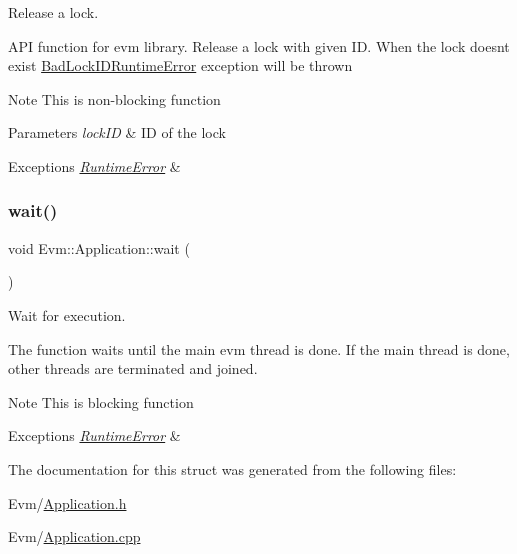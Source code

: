 Release a lock. 

A\+PI function for evm library. Release a lock with given ID. When the lock doesn\textquotesingle{}t exist \mbox{\hyperlink{struct_evm_1_1_bad_lock_i_d_runtime_error}{Bad\+Lock\+I\+D\+Runtime\+Error}} exception will be thrown \begin{DoxyNote}{Note}
This is non-\/blocking function 
\end{DoxyNote}

\begin{DoxyParams}{Parameters}
{\em lock\+ID} & ID of the lock \\
\hline
\end{DoxyParams}

\begin{DoxyExceptions}{Exceptions}
{\em \mbox{\hyperlink{struct_evm_1_1_runtime_error}{Runtime\+Error}}} & \\
\hline
\end{DoxyExceptions}
\mbox{\label{struct_evm_1_1_application_a17e8baa475b18f35f70823a91f12304c}} 
\subsubsection{\texorpdfstring{wait()}{wait()}}
{\footnotesize\ttfamily void Evm\+::\+Application\+::wait (\begin{DoxyParamCaption}{ }\end{DoxyParamCaption})}



Wait for execution. 

The function waits until the main evm thread is done. If the main thread is done, other threads are terminated and joined. \begin{DoxyNote}{Note}
This is blocking function 
\end{DoxyNote}

\begin{DoxyExceptions}{Exceptions}
{\em \mbox{\hyperlink{struct_evm_1_1_runtime_error}{Runtime\+Error}}} & \\
\hline
\end{DoxyExceptions}


The documentation for this struct was generated from the following files\+:\begin{DoxyCompactItemize}
\item 
Evm/\mbox{\hyperlink{_application_8h}{Application.\+h}}\item 
Evm/\mbox{\hyperlink{_application_8cpp}{Application.\+cpp}}\end{DoxyCompactItemize}
